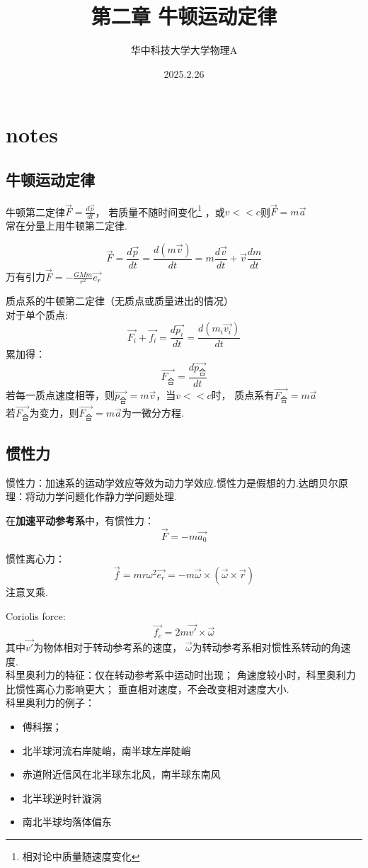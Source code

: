 \documentclass[10pt,a4paper]{article}
\title{第二章 牛顿运动定律}
\author{华中科技大学大学物理A}
\date{2025.2.26}
\begin{document}
\maketitle
\section{notes}
\subsection{牛顿运动定律}
牛顿第二定律$\vec{F}=\frac{d\vec{p}}{dt}$，
若质量不随时间变化\footnote{相对论中质量随速度变化}
，或$v<<c$则$\vec{F}=m\vec{a}$\\
常在分量上用牛顿第二定律.

\[\vec{F}=\frac{d\vec{p}}{dt}=\frac{d(m\vec{v})}{dt}
=m\frac{d\vec{v}}{dt}+\vec{v}\frac{dm}{dt}\]
万有引力$\vec{F}=-\frac{GMm}{r^{2}}\vec{e_r}$

质点系的牛顿第二定律（无质点或质量进出的情况）\\
对于单个质点:
\[\vec{F_i}+\vec{f_i}=\frac{d\vec{p_i}}{dt}=\frac{d(m_i\vec{v_i})}{dt}\]
累加得：
\[\vec{F_\text{合}}=\frac{d\vec{p_\text{合}}}{dt}\]
若每一质点速度相等，则$\vec{p_\text{合}}=m\vec{v}$，当$v<<c$时，
质点系有$\vec{F_\text{合}}=m\vec{a}$\\
若$\vec{F_\text{合}}$为变力，则$\vec{F_\text{合}}=m\vec{a}$为一微分方程.
\subsection{惯性力}
惯性力：加速系的运动学效应等效为动力学效应.惯性力是假想的力.达朗贝尔原理：将动力学问题化作静力学问题处理.

在\textbf{加速平动参考系}中，有惯性力：
\[\vec{F}=-m\vec{a_0}
\]

惯性离心力：
\[\vec{f}=mr\omega^{2}\vec{e_r}
=-m\vec{\omega}\times(\vec{\omega}\times\vec{r})
\]注意叉乘.

Coriolis force:
\begin{equation*}
\boxed{\vec{f_c}=2m\vec{v'}\times\vec{\omega}}
\end{equation*}
其中$\vec{v'}$为物体相对于转动参考系的速度，
$\vec{\omega}$为转动参考系相对惯性系转动的角速度.\\
科里奥利力的特征：仅在转动参考系中运动时出现；
角速度较小时，科里奥利力比惯性离心力影响更大；
垂直相对速度，不会改变相对速度大小.\\
科里奥利力的例子：
\begin{itemize}
\item 傅科摆；
\item 北半球河流右岸陡峭，南半球左岸陡峭
\item 赤道附近信风在北半球东北风，南半球东南风
\item 北半球逆时针漩涡
\item 南北半球均落体偏东
\end{itemize}
\end{document}
